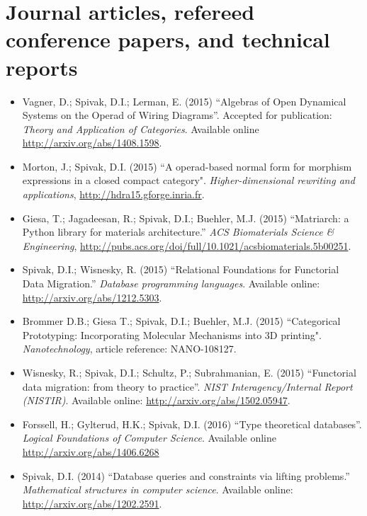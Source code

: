 \documentclass[11pt,oneside,article]{memoir}
\begin{document}
\section{Journal articles, refereed conference papers, and technical reports}
\begin{itemize}

\item Vagner, D.; Spivak, D.I.; Lerman, E. (2015) ``Algebras of Open Dynamical Systems on the Operad of Wiring Diagrams''. Accepted for publication: \emph{Theory and Application of Categories}. Available online \url{http://arxiv.org/abs/1408.1598}.

\item Morton, J.; Spivak, D.I. (2015) ``A operad-based normal form for morphism expressions in a closed compact category". \emph{Higher-dimensional rewriting and applications}, \url{http://hdra15.gforge.inria.fr}.

\item Giesa, T.; Jagadeesan, R.; Spivak, D.I.; Buehler, M.J. (2015) ``Matriarch: a Python library for materials architecture.'' \emph{ACS Biomaterials Science \& Engineering}, \url{http://pubs.acs.org/doi/full/10.1021/acsbiomaterials.5b00251}.

\item Spivak, D.I.; Wisnesky, R. (2015) ``Relational Foundations for Functorial Data Migration.'' \emph{Database programming languages}. Available online: \url{http://arxiv.org/abs/1212.5303}.

\item Brommer D.B.; Giesa T.; Spivak, D.I.; Buehler, M.J. (2015) ``Categorical Prototyping: Incorporating Molecular Mechanisms into 3D printing". \emph{Nanotechnology}, article reference: NANO-108127.

\item Wisnesky, R.; Spivak, D.I.; Schultz, P.; Subrahmanian, E. (2015) ``Functorial data migration: from theory to practice''. \emph{NIST Interagency/Internal Report (NISTIR)}. Available online: \url{http://arxiv.org/abs/1502.05947}.

\item Forssell, H.; Gylterud, H.K.; Spivak, D.I. (2016) ``Type theoretical databases''. \emph{Logical Foundations of Computer Science}. Available online \url{http://arxiv.org/abs/1406.6268}

\item Spivak, D.I. (2014) ``Database queries and constraints via lifting problems.'' \emph{Mathematical structures in computer science}.  Available online: \url{http://arxiv.org/abs/1202.2591}.


\end{itemize}
\end{document}
